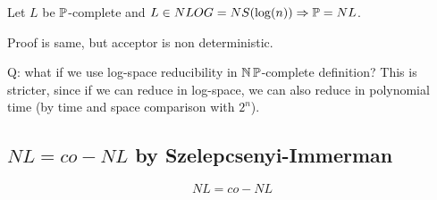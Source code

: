 \begin{consequence}
	Let $L$ be $\operatorname{\mathbb{P}}$-complete and $L \in NLOG = NS(\log(n)) \Rightarrow \operatorname{\mathbb{P}} = NL$.

	Proof is same, but acceptor is non deterministic.
\end{consequence}

Q: what if we use log-space reducibility in $\operatorname{\operatorname{\mathbb{N}}\mathbb{P}}$-complete definition?
This is stricter, since if we can reduce in log-space, we can also reduce in polynomial time (by time and space comparison with $2^n$).

\subsection{$NL = co-NL$ by Szelepcsenyi-Immerman}

\begin{theorem}
	\[NL = co-NL \]
\end{theorem}
